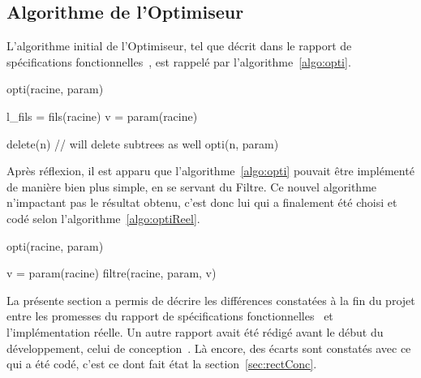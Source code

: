 \subsection{Algorithme de l'Optimiseur}
\label{ssec:algoOptim}

    L'algorithme initial de l'Optimiseur, tel que décrit dans le rapport de spécifications fonctionnelles~\cite{spec_fonc}, est rappelé par l'{\sc algorithme}~\ref{algo:opti}.

         \begin{algorithm}[H]
            \caption{opti(racine, param)}
            \label{algo:opti}
            \begin{algorithmic}
                \STATE l\_fils = fils(racine)
                    \RETURN
                \ENDIF
                \STATE
                    \STATE v = param(racine)

                            \STATE delete(n) // will delete subtrees as well
                        \ENDIF
                    \ENDFOR
                \ENDIF
                \STATE
                    \STATE opti(n, param)
                \ENDFOR
            \end{algorithmic}
        \end{algorithm}

Après réflexion, il est apparu que l'{\sc algorithme}~\ref{algo:opti} pouvait être implémenté de manière bien plus simple, en se servant du Filtre. Ce nouvel algorithme n'impactant pas le résultat obtenu, c'est donc lui qui a finalement été choisi et codé selon l'{\sc algorithme}~\ref{algo:optiReel}.

	\begin{algorithm}[H]
            \caption{opti(racine, param)}
            \label{algo:optiReel}
            \begin{algorithmic}
		\STATE v = param(racine)
		\STATE filtre(racine, param, v)
            \end{algorithmic}
        \end{algorithm}

    La présente section a permis de décrire les différences constatées à la fin du projet entre les promesses du rapport de spécifications fonctionnelles~\cite{spec_fonc} et l'implémentation réelle. Un autre rapport avait été rédigé avant le début du développement, celui de conception~\cite{conception}. Là encore, des écarts sont constatés avec ce qui a été codé, c'est ce dont fait état la {\sc section}~\ref{sec:rectConc}. 

